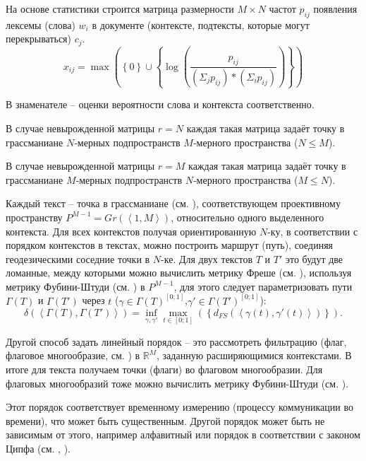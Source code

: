 На основе статистики строится матрица размерности $M\times{N}$ частот $p_{ij}$ появления лексемы (слова) $w_{i}$ в документе (контексте, подтексты, которые могут перекрываться) $c_{j}$.
$$
x_{ij}=\max{\left( \left\lbrace 0\right\rbrace \cup \left\lbrace \log{\left(\frac{p_{ij}}{\left( \Sigma_{j} p_{ij}\right) *\left( \Sigma_{i} p_{ij}\right) } \right) }\right\rbrace \right) }
$$

В знаменателе -- оценки вероятности слова и контекста соответственно.

В случае невырожденной матрицы $r=N$ каждая такая матрица задаёт точку в грассманиане $N$‑мерных подпространств $M$‑мерного пространства ($N\leq{M}$).

В случае невырожденной матрицы $r=M$ каждая такая матрица задаёт точку в грассманиане $M$‑мерных подпространств $N$‑мерного пространства ($M\leq{N}$).

Каждый текст -- точка в грассманиане (см. ), соответствующем проективному пространству $P^{M-1}=Gr\left( \left\langle1,M \right\rangle \right)$, относительно одного выделенного контекста. Для всех контекстов получая ориентированную $N$-ку, в соответствии с порядком контекстов в текстах, можно построить маршрут (путь), соединяя геодезическими соседние точки в $N$-ке. Для двух текстов $T$ и $T'$ это будут две ломанные, между которыми можно вычислить метрику Фреше (см. ), используя метрику Фубини-Штуди (см. ) в $P^{M-1}$, для этого следует параметризовать пути $\Gamma\left( T \right)$ и $\Gamma\left( T' \right)$ через $t$ ($\gamma\in\Gamma\left( T \right)^{\left[ 0;1\right] }$,$\gamma' \in\Gamma\left( T'\right)^{\left[ 0;1\right] }$): 
$$
\delta\left( \left\langle \Gamma\left( T \right),\Gamma\left( T'\right)\right\rangle \right) =\inf_{\gamma,\gamma'}\max_{t\in\left[ 0;1\right] }\left(  \left\lbrace d_{FS}\left( \left\langle \gamma\left( t\right) ,\gamma'\left( t\right) \right\rangle \right) \right\rbrace \right).
$$

Другой способ задать линейный порядок -- это рассмотреть фильтрацию (флаг, флаговое многообразие, см. ) в $\mathbb{R}^{M}$, заданную расширяющимися контекстами. В итоге для текста получаем точки (флаги) во флаговом многообразии. Для флаговых многообразий тоже можно вычислить метрику Фубини-Штуди (см. ).

Этот порядок соответствует временному измерению (процессу коммуникации во времени), что может быть существенным. Другой порядок может быть не зависимым от этого, например алфавитный или порядок в соответствии с законом Ципфа (см. , ). 

